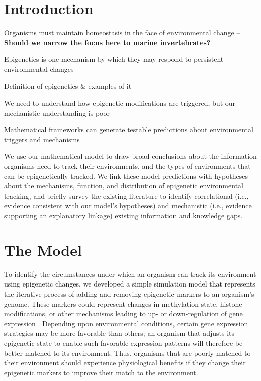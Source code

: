 \documentclass{article}
\begin{document}
\clearpage

\section*{Introduction}

Organisms must maintain homeostasis in the face of environmental change -- \textbf{Should we narrow the focus here to marine invertebrates?}

Epigenetics is one mechanism by which they may respond to persistent environmental changes

Definition of epigenetics \& examples of it

We need to understand how epigenetic modifications are triggered, but our mechanistic understanding is poor

Mathematical frameworks can generate testable predictions about environmental triggers and mechanisms


We use our mathematical model to draw broad conclusions about the information organisms need to track their environments, and the types of environments that can be epigenetically tracked. We link these model predictions with hypotheses about the mechanisms, function, and distribution of epigenetic environmental tracking, and briefly survey the existing literature to identify correlational (i.e., evidence consistent with our model's hypotheses) and mechanistic (i.e., evidence supporting an explanatory linkage) existing information and knowledge gaps.


\section*{The Model}
To identify the circumstances under which an organism can track its environment using epigenetic changes, we developed a simple simulation model that represents the iterative process of adding and removing epigenetic markers to an organism's genome. These markers could represent changes in methylation state, histone modifications, or other mechanisms leading to up- or down-regulation of gene expression \cite{eirin2019marine}. Depending upon environmental conditions, certain gene expression strategies may be more favorable than others; an organism that adjusts its epigenetic state to enable such favorable expression patterns will therefore be better matched to its environment. Thus, organisms that are poorly matched to their environment should experience physiological benefits if they change their epigenetic markers to improve their match to the environment.
\end{document}

